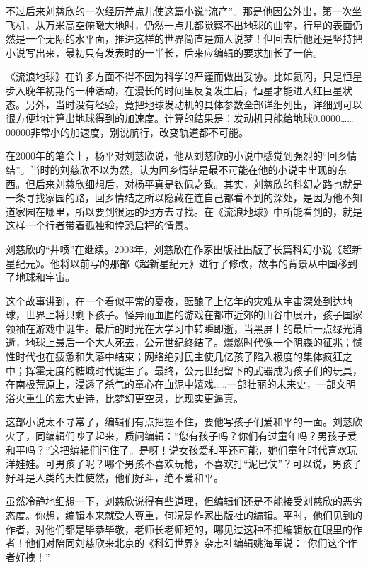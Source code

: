\documentclass[fontset=fandol,12pt,a5paper]{ctexbook}
\begin{document}
不过后来刘慈欣的一次经历差点儿使这篇小说“流产”。那是他因公外出，第一次坐飞机，从万米高空俯瞰大地时，仍然一点儿都觉察不出地球的曲率，行星的表面仍然是一个无际的水平面，推进这样的世界简直是痴人说梦！但回去后他还是坚持把小说写出来，最初只有发表时的一半长，后来应编辑的要求加长了一倍。

《流浪地球》在许多方面不得不因为科学的严谨而做出妥协。比如氦闪，只是恒星步入晚年初期的一种活动，在漫长的时间里反复发生后，恒星才能进入红巨星状态。另外，当时没有经验，竟把地球发动机的具体参数全部详细列出，详细到可以很方便地计算出地球得到的加速度。计算的结果是：发动机只能给地球0.0000……00000非常小的加速度，别说航行，改变轨道都不可能。

在2000年的笔会上，杨平对刘慈欣说，他从刘慈欣的小说中感觉到强烈的“回乡情结”。当时的刘慈欣不以为然，认为回乡情结是最不可能在他的小说中出现的东西。但后来刘慈欣细想后，对杨平真是钦佩之致。其实，刘慈欣的科幻之路也就是一条寻找家园的路，回乡情结之所以隐藏在连自己都看不到的深处，是因为他不知道家园在哪里，所以要到很远的地方去寻找。在《流浪地球》中所能看到的，就是这样一个行者带着孤独和惶恐启程的情景。

刘慈欣的“井喷”在继续。2003年，刘慈欣在作家出版社出版了长篇科幻小说《超新星纪元》。他将以前写的那部《超新星纪元》进行了修改，故事的背景从中国移到了地球和宇宙。

这个故事讲到，在一个看似平常的夏夜，酝酿了上亿年的灾难从宇宙深处到达地球，世界上将只剩下孩子。怪异而血腥的游戏在都市近郊的山谷中展开，孩子国家领袖在游戏中诞生。最后的时光在大学习中转瞬即逝，当黑屏上的最后一点绿光消逝，地球上最后一个大人死去，公元世纪终结了。爆燃时代像一个阴森的征兆；惯性时代也在疲惫和失落中结束；网络绝对民主使几亿孩子陷入极度的集体疯狂之中；挥霍无度的糖城时代诞生了。最终，公元世纪留下的武器成为孩子们的玩具，在南极荒原上，浸透了杀气的童心在血泥中嬉戏……一部壮丽的未来史，一部文明浴火重生的宏大史诗，比梦幻更空灵，比现实更逼真。

这部小说太不寻常了，编辑们有点把握不住，要他写孩子们爱和平的一面。刘慈欣火了，同编辑们吵了起来，质问编辑：“您有孩子吗？你们有过童年吗？男孩子爱和平吗？”这把编辑们问住了。是呀！说女孩爱和平还可能，她们童年时代喜欢玩洋娃娃。可男孩子呢？哪个男孩不喜欢玩枪，不喜欢打“泥巴仗”？可以说，男孩子好斗是人类的天性使然，他们好斗，绝不爱和平。

虽然冷静地细想一下，刘慈欣说得有些道理，但编辑们还是不能接受刘慈欣的恶劣态度。你想，编辑本来就受人尊重，何况是作家出版社的编辑。平时，他们见到的作者，对他们都是毕恭毕敬，老师长老师短的，哪见过这种不把编辑放在眼里的作者！他们对陪同刘慈欣来北京的《科幻世界》杂志社编辑姚海军说：“你们这个作者好拽！”
\end{document}
